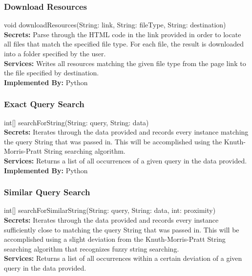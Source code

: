 \documentclass[titlepage]{article}
\begin{document}
\subsubsection{Download Resources}
void downloadResources(String: link, String: fileType, String: destination)\\

\textbf{Secrets:}
Parse through the HTML code in the link provided in order to locate all files that match the specified file type. For each file, the result is downloaded into a folder specified by the user.\\

\textbf{Services:}
Writes all resources matching the given file type from the page link to the file specified by destination.\\

\textbf{Implemented By:}
Python

\subsubsection{Exact Query Search}
int[] searchForString(String: query, String: data)\\

\textbf{Secrets:}
Iterates through the data provided and records every instance matching the query String that was passed in. This will be accomplished using the Knuth-Morris-Pratt String searching algorithm.\\

\textbf{Services:}
Returns a list of all occurrences of a given query in the data provided.\\

\textbf{Implemented By:}
Python


\subsubsection{Similar Query Search}
int[] searchForSimilarString(String: query, String: data, int: proximity)\\

\textbf{Secrets:}
Iterates through the data provided and records every instance sufficiently close to matching the query String that was passed in. This will be accomplished using a slight deviation from the Knuth-Morris-Pratt String searching algorithm that recognizes fuzzy string searching.\\

\textbf{Services:}
Returns a list of all occurrences within a certain deviation of a given query in the data provided.\\
\end{document}
